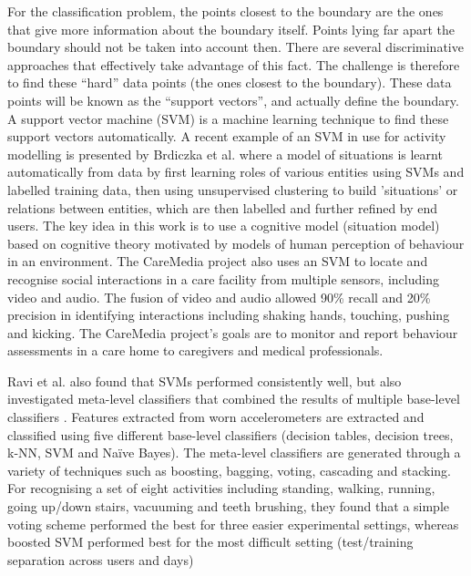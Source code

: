 For the classification problem, the points closest to the boundary are the ones that give more information about the boundary itself. Points lying far apart the boundary should not be taken into account then. There are several discriminative approaches that effectively take advantage of this fact. The challenge is therefore to find these “hard” data points (the ones closest to the boundary). These data points will be known as the “support vectors”, and actually define the boundary. A support vector machine (SVM) is a machine learning technique to find these support vectors automatically. A recent example of an SVM in use for activity modelling is presented by Brdiczka et al. \cite{Brdiczka2009} where a model of situations is learnt automatically from data by first learning roles of various entities using SVMs and labelled training data, then using unsupervised clustering to build ’situations’ or relations between entities, which are then labelled and further refined by end users. The key idea in this work is to use a cognitive model (situation model) based on cognitive theory motivated by models of human perception of behaviour in an environment. The CareMedia project \cite{Chen2005} also uses an SVM to locate and recognise social interactions in a care facility from multiple sensors, including video and audio. The fusion of video and audio allowed 90\% recall and 20\% precision in identifying interactions including shaking hands, touching, pushing and kicking. The CareMedia project’s goals are to monitor and report behaviour assessments in a care home to caregivers and medical professionals.

Ravi et al. also found that SVMs performed consistently well, but also investigated meta-level classifiers that combined the results of multiple base-level classifiers \cite{Ravi2005}. Features extracted from worn accelerometers are extracted and classified using five different base-level classifiers (decision tables, decision trees, k-NN, SVM and Na\"ive Bayes). The meta-level classifiers are generated through a variety of techniques such as boosting, bagging, voting, cascading and stacking. For recognising a set of eight activities including standing, walking, running, going up/down stairs, vacuuming and teeth brushing, they found that a simple voting scheme performed the best for three easier experimental settings, whereas boosted SVM performed best for the most difficult setting (test/training separation across users and days)

